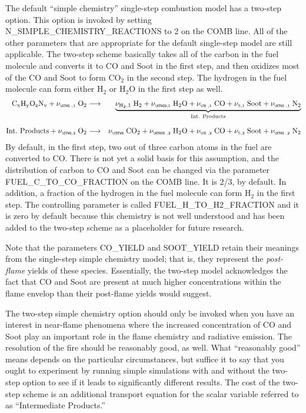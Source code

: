 \documentclass[11pt]{book}
\begin{document}
The default ``simple chemistry'' single-step combustion model has a two-step option. This option is invoked by setting {\ct N\_SIMPLE\_CHEMISTRY\_REACTIONS} to 2 on the {\ct COMB} line. All of the other parameters that are appropriate for the default single-step model are still applicable. The two-step scheme basically takes all of the carbon in the fuel molecule and converts it to CO and Soot in the first step, and then oxidizes most of the CO and Soot to form CO$_2$ in the second step. The hydrogen in the fuel molecule can form either H$_2$ or H$_2$O in the first step as well.
\begin{eqnarray}
  \mathrm{C_xH_yO_zN_v} + \nu_{\text{\tiny \OTWO ,1}} \; \mathrm{O_2} &\longrightarrow& \underbrace{ \nu_{\mathrm{\tiny H_2,1}} \; \mathrm{H_2} + \nu_{\text{\tiny \HTWOO,1}} \; \mathrm{H_2O} + \nu_{\text{\tiny \CO ,1}} \; \mathrm{CO}   + \nu_{\text{\tiny S,1}} \; \mathrm{Soot} + \nu_{\text{\tiny \NTWO ,1}} \; \mathrm{N_2} }_{\rm Int.~Products} \\[0.1in]
   \mathrm{Int.~Products} + \nu_{\text{\tiny \OTWO,2}} \; \mathrm{O_2} &\longrightarrow& \nu_{\text{\tiny \COTWO}} \; \mathrm{CO_2} + \nu_{\text{\tiny \HTWOO ,2}} \; \mathrm{H_2O} + \nu_{\text{\tiny \CO ,2}} \; \mathrm{CO}   + \nu_{\text{\tiny S,2}} \; \mathrm{Soot} + \nu_{\text{\tiny \NTWO ,2}} \; \mathrm{N_2}
\end{eqnarray}
By default, in the first step, two out of three carbon atoms in the fuel are converted to CO. There is not yet a solid basis for this assumption, and the distribution of carbon to CO and Soot can be changed via the parameter {\ct FUEL\_C\_TO\_CO\_FRACTION} on the {\ct COMB} line. It is 2/3, by default. In addition, a fraction of the hydrogen in the fuel molecule can form H$_2$ in the first step. The controlling parameter is called {\ct FUEL\_H\_TO\_H2\_FRACTION} and it is zero by default because this chemistry is not well understood and has been added to the two-step scheme as a placeholder for future research.

Note that the parameters {\ct CO\_YIELD} and {\ct SOOT\_YIELD} retain their meanings from the single-step simple chemistry model; that is, they represent the {\em post-flame} yields of these species. Essentially, the two-step model acknowledges the fact that CO and Soot are present at much higher concentrations within the flame envelop than their post-flame yields would suggest.

The two-step simple chemistry option should only be invoked when you have an interest in near-flame phenomena where the increased concentration of CO and Soot play an important role in the flame chemistry and radiative emission. The resolution of the fire should be reasonably good, as well. What ``reasonably good'' means depends on the particular circumstances, but suffice it to say that you ought to experiment by running simple simulations with and without the two-step option to see if it leads to significantly different results. The cost of the two-step scheme is an additional transport equation for the scalar variable referred to as ``Intermediate Products.''
\end{document}
